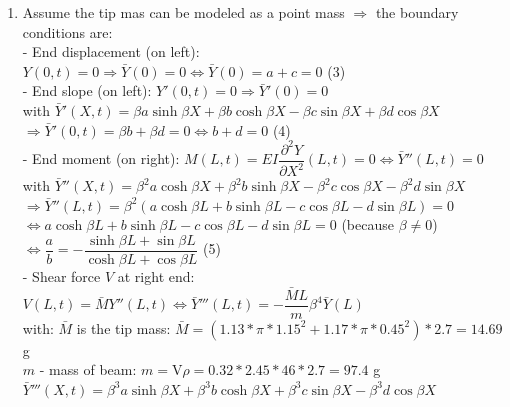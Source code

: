 \documentclass[14pt,a4paper]{article}
\begin{document}
\begin{enumerate}
	\item Assume the tip mas can be modeled as a point mass $\Rightarrow$ the boundary conditions are:\\
	- End displacement (on left): $Y(0,t) = 0 \Rightarrow \bar{Y}(0) = 0 \Leftrightarrow \bar{Y}(0) = a + c = 0$ \hspace{1cm} (3)\\
	- End slope (on left): $Y'(0,t) = 0 \Rightarrow \bar{Y}'(0) = 0$\\
	with $ \bar{Y}'(X,t) = \beta a \sinh \beta X + \beta b \cosh \beta X - \beta c \sin \beta X + \beta d \cos \beta X $\\
	$\Rightarrow \bar{Y}'(0,t) = \beta b + \beta d = 0 \Leftrightarrow b + d = 0$ \hspace{6.5cm} (4) \\
	- End moment (on right): $ M(L,t) = EI\dfrac{\partial^2Y}{\partial X^2} (L,t) = 0 \Leftrightarrow \bar{Y}''(L,t) = 0$\\
	with $ \bar{Y}''(X,t) = \beta^2 a \cosh \beta X + \beta^2 b \sinh \beta X - \beta^2 c \cos \beta X - \beta^2 d \sin \beta X $\\
	$\Rightarrow \bar{Y}''(L,t) = \beta^2 \left(a \cosh \beta L + b \sinh \beta L - c \cos \beta L - d \sin \beta L \right) = 0 $\\
	\hspace*{1.6cm} $\Leftrightarrow a \cosh \beta L + b \sinh \beta L - c \cos \beta L - d \sin \beta L = 0 $ \hspace{1cm} (because $\beta \neq 0$) \\
	\hspace*{1.6cm} $ \Leftrightarrow \dfrac{a}{b} = -\dfrac{ \sinh\beta L + \sin \beta L}{\cosh \beta L + \cos \beta L} $ \hspace{6.5cm} (5)\\ 
	- Shear force $V$ at right end: $V(L,t) = \bar{M}Y''(L,t) \Leftrightarrow \bar{Y}'''(L,t) = -\dfrac{\bar{M}L}{m}\beta^4\bar{Y}(L)$\\
	with: $\bar{M}$ is the tip mass: $\bar{M} = (1.13*\pi*1.15^2 + 1.17*\pi*0.45^2)*2.7 = 14.69$ g\\
	\hspace*{0.8cm} $m$ - mass of beam: $m = \mathrm{V}\rho = 0.32*2.45*46*2.7 = 97.4$ g\\  
	\hspace*{0.8cm} $ \bar{Y}'''(X,t) = \beta^3 a \sinh \beta X + \beta^3 b \cosh \beta X + \beta^3 c \sin \beta X - \beta^3 d \cos \beta X $\\

\end{enumerate}
\end{document}
